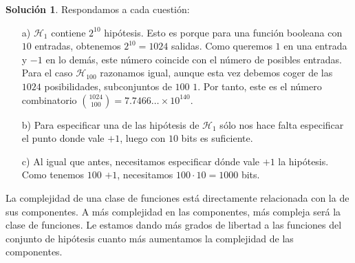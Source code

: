 \documentclass[a4paper, 11pt]{article}
\theoremstyle{definition}
\newtheorem*{solucion}{Solución}
\begin{document}
  \begin{solucion}
    Respondamos a cada cuestión:

    \begin{enumerate}
      \item[a)] $\mathcal{H}_1$ contiene $2^{10}$ hipótesis. Esto es porque para una función booleana con $10$ entradas, obtenemos $2^{10}=1024$ salidas. Como queremos $1$ en una entrada y $-1$ en lo demás, este número coincide con el número de posibles entradas. Para el caso $\mathcal{H}_{100}$ razonamos igual, aunque esta vez debemos coger de las $1024$ posibilidades, subconjuntos de $100$ $1$. Por tanto, este es el número combinatorio ${\binom{1024}{100}} = 7.7466\ldots \times 10^{140}$.
      \item[b)] Para especificar una de las hipótesis de $\mathcal{H}_1$ sólo nos hace falta especificar el punto donde vale $+1$, luego con $10$ bits es suficiente.
      \item[c)] Al igual que antes, necesitamos especificar dónde vale $+1$ la hipótesis. Como tenemos $100$ $+1$, necesitamos $100 \cdot 10 = 1000$ bits.
    \end{enumerate}

    La complejidad de una clase de funciones está directamente relacionada con la de sus componentes. A más complejidad en las componentes, más compleja será la clase de funciones. Le estamos dando más grados de libertad a las funciones del conjunto de hipótesis cuanto más aumentamos la complejidad de las componentes.
  \end{solucion}
\end{document}
